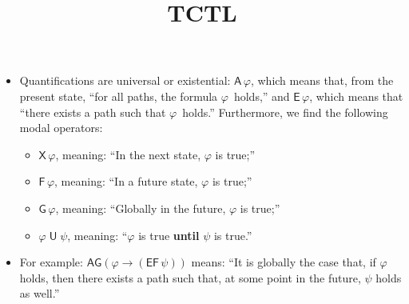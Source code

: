 \documentclass[wide]{slides}
\begin{document}
\begin{slide}
  \title{TCTL}

  \begin{itemize}

    \item Quantifications are universal or existential: $\textsf{A} \,
      \varphi$, which means that, from the present state, ``for all
      paths, the formula $\varphi$~holds,'' and $\textsf{E}\,
      \varphi$, which means that ``there exists a path such that
      $\varphi$~holds.''  Furthermore, we find the following modal
      operators:
      \begin{itemize}

        \item $\textsf{X} \, \varphi$, meaning: ``In the next state,
          $\varphi$ is true;''

        \item $\textsf{F}\,\varphi$, meaning: ``In a future state,
          $\varphi$ is true;''

        \item $\textsf{G} \, \varphi$, meaning: ``Globally in the
          future, $\varphi$ is true;''

        \item $\varphi \mathrel{\textsf{U}} \psi$, meaning:
          ``$\varphi$ is true \textbf{until} $\psi$ is true.''

      \end{itemize}

    \item For example: $\textsf{AG}(\varphi \rightarrow
      (\textsf{EF}\,\psi))$ means: ``It is globally the case that, if
      $\varphi$ holds, then there exists a path such that, at some
      point in the future, $\psi$ holds as well.''

  \end{itemize}
\end{slide}
\end{document}

